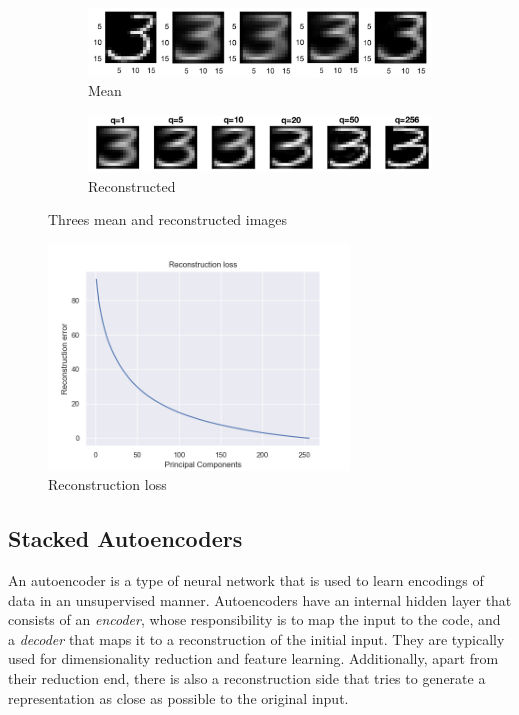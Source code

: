\documentclass[11pt,conference,compsoc]{IEEEtran}
\begin{document}
\begin{figure}[h]
    \centering
    \begin{subfigure}[b]{0.32\textwidth}
    \includegraphics[width=\linewidth]{images/3s.png}
    \caption{Mean}
    \end{subfigure}
    \begin{subfigure}[b]{0.32\textwidth}
    \includegraphics[width=\linewidth]{images/3s_recon.png}
    \caption{Reconstructed}
    \end{subfigure}
    \caption{Threes mean and reconstructed images}
    \label{fig:11}
\end{figure}

\begin{figure}[h]
    \centering
    \includegraphics[width=8cm]{images/reconloss.png}
    \caption{Reconstruction loss}
    \label{fig:12}
\end{figure}

\subsection{Stacked Autoencoders}
An autoencoder is a type of neural network that is used to learn encodings of data in an unsupervised manner. Autoencoders have an internal hidden layer that consists of an \textit{encoder}, whose responsibility is to map the input to the code, and a \textit{decoder} that maps it to a reconstruction of the initial input. They are typically used for dimensionality reduction and feature learning. Additionally, apart from their reduction end, there is also a reconstruction side that tries to generate a representation as close as possible to the original input.  
\end{document}
